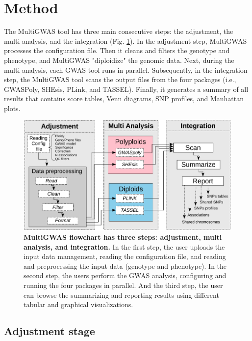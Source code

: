 \documentclass{article}
\begin{document}
\section{Method}

The MultiGWAS tool has three main consecutive steps: the adjustment, the multi analysis, and the integration (Fig. \ref{fig:Pipeline}). In the adjustment step, MultiGWAS processes the configuration file. Then it cleans and filters the genotype and phenotype, and  MultiGWAS "diploidize" the genomic data. Next, during the multi analysis, each GWAS tool runs in parallel. Subsequently, in the integration step, the MultiGWAS tool scans the output files from the four packages (i.e., GWASPoly, SHEsis, PLink, and TASSEL). Finally, it generates a summary of all results that contains score tables, Venn diagrams, SNP profiles, and Manhattan plots. 
\begin{figure}
\centering{}\includegraphics[width=12cm]{images/paper-multiGWAS-flowchart-stages} \caption{\textbf{MultiGWAS flowchart has three steps: adjustment, multi analysis, and integration.} In the first step, the user uploads the input data management, reading the configuration file, and reading and preprocessing the input data (genotype and phenotype). In the second step, the users perform the GWAS analysis, configuring and running the four packages in parallel. And the third step, the user can browse the summarizing and reporting results using different tabular and graphical visualizations.\label{fig:Pipeline}}
\end{figure}



\subsection{Adjustment stage}
\end{document}
